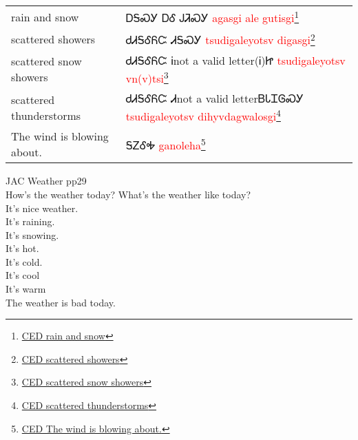 \begin{minipage}{\linewidth}
\begin{tabular}{p{3cm} p{11cm}}
rain and snow & ᎠᎦᏍᎩ ᎠᎴ ᎫᏘᏍᎩ 
 \newline \textcolor{red}{agasgi ale gutisgi}\footnote{\href{https://cherokeedictionary.net/share/101983}{CED rain and snow}}\\
scattered showers & ᏧᏗᎦᎴᏲᏨ ᏗᎦᏍᎩ 
 \newline \textcolor{red}{tsudigaleyotsv digasgi}\footnote{\href{https://cherokeedictionary.net/share/101984}{CED scattered showers}}\\
scattered snow showers & ᏧᏗᎦᎴᏲᏨ Ꭵnot a valid letter(Ꭵ)Ꮵ 
 \newline \textcolor{red}{tsudigaleyotsv vn(v)tsi}\footnote{\href{https://cherokeedictionary.net/share/101985}{CED scattered snow showers}}\\
scattered thunderstorms & ᏧᏗᎦᎴᏲᏨ  Ꮧnot a valid letterᏴᏓᏆᎶᏍᎩ 
 \newline \textcolor{red}{tsudigaleyotsv  dihyvdagwalosgi}\footnote{\href{https://cherokeedictionary.net/share/101986}{CED scattered thunderstorms}}\\
The wind is blowing about. & ᎦᏃᎴᎭ 
 \newline \textcolor{red}{ganoleha}\footnote{\href{https://cherokeedictionary.net/share/101987}{CED The wind is blowing about.}}\\
\end{tabular}
\end{minipage}

JAC Weather pp29\\
How's the weather today? What's the weather like today?\\
It's nice weather.\\
It's raining.\\
It's snowing.\\
It's hot.\\
It's cold.\\
It's cool\\
It's warm\\
The weather is bad today.\\
